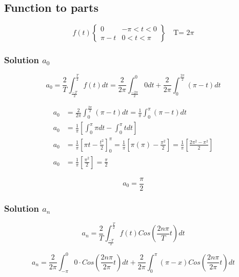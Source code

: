 \documentclass{article}
\begin{document}
\subsection{Function to parts}
\begin{equation}
    f(t)\begin{Bmatrix}
0 & -\pi< t < 0\\ 
\pi -t & 0 < t <\pi 
\end{Bmatrix}
\quad \text{T= 2$\pi$}
\end{equation}

\subsubsection{Solution $a_0$}

\begin{equation}
    a_0=\frac{2}{T} \int_{\frac{-T}{2}}^{\frac{T}{2}}f(t)dt = \frac{2}{2 \pi} \int_{\frac{-2 \pi}{2}}^{0}0dt+ \frac{2}{2 \pi} \int_{0}^{\frac{2 \pi}{2}}(\pi - t)dt
\end{equation}

\begin{align*}
    a_0&=\frac{2}{2 \pi} \int_{0}^{\frac{2 \pi}{2}}(\pi - t)dt= \frac{1}{ \pi} \int_{0}^{\pi}(\pi - t)dt\\
    a_0&= \frac{1}{ \pi} \left [\int_{0}^{\pi}\pi dt -  \int_{0}^{\pi}t dt \right ]\\
    a_0&= \frac{1}{ \pi} \left [ \pi t -  \frac{t^2}{2} \right ]_{0}^{\pi}=\frac{1}{ \pi} \left [ \pi (\pi) -  \frac{\pi ^2}{2} \right ]= \frac{1}{ \pi} \left [  \frac{2 \pi^2 -\pi^2}{2} \right ]\\
    a_0&=\frac{1}{ \pi} \left [  \frac{\pi^2}{2} \right ]=\frac{\pi}{2}
\end{align*}

\begin{equation}
\boxed{ a_0=\frac{\pi}{2}}
\end{equation}
\subsubsection{Solution $a_n$}

\begin{equation}
    a_n=\frac{2}{T} \int_{\frac{-T}{2}}^{\frac{T}{2}}f(t)Cos \left ( \frac{2 n \pi}{T}t\right )dt
\end{equation}

\begin{equation}
    a_n=\frac{2}{2 \pi} \int_{- \pi}^{0}0 \cdot Cos \left ( \frac{2 n \pi}{2 \pi}t\right )dt+\frac{2}{2 \pi} \int_{0}^{\pi}(\pi -x) Cos \left ( \frac{2 n \pi}{2 \pi}t\right )dt
\end{equation}
\end{document}
